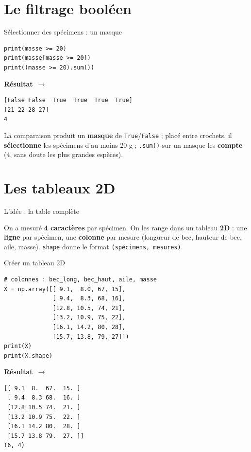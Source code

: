 \documentclass[aspectratio=169,11pt]{beamer}
\newcommand{\resultat}{{\scriptsize\textbf{R\'esultat}~$\rightarrow$}\par\vspace{1pt}}
\begin{document}
\section{Le filtrage booléen}

\begin{frame}[fragile]{Sélectionner des spécimens : un masque}
\begin{lstlisting}
print(masse >= 20)
print(masse[masse >= 20])
print((masse >= 20).sum())
\end{lstlisting}
\resultat
\begin{lstlisting}[style=out]
[False False  True  True  True  True]
[21 22 28 27]
4
\end{lstlisting}
{\small La comparaison produit un \textbf{masque} de \texttt{True}/\texttt{False} ; placé entre crochets, il \textbf{sélectionne} les spécimens d'au moins 20 g ; \texttt{.sum()} sur un masque les \textbf{compte} (4, sans doute les plus grandes espèces).}
\end{frame}

\section{Les tableaux 2D}

\begin{frame}{L'idée : la table complète}
\begin{ucaddef}
{\small On a mesuré \textbf{4 caractères} par spécimen. On les range dans un tableau \textbf{2D} : une \textbf{ligne} par spécimen, une \textbf{colonne} par mesure (longueur de bec, hauteur de bec, aile, masse). \texttt{shape} donne le format \texttt{(spécimens, mesures)}.}
\end{ucaddef}
\end{frame}

\begin{frame}[fragile]{Créer un tableau 2D}
\begin{lstlisting}
# colonnes : bec_long, bec_haut, aile, masse
X = np.array([[ 9.1,  8.0, 67, 15],
              [ 9.4,  8.3, 68, 16],
              [12.8, 10.5, 74, 21],
              [13.2, 10.9, 75, 22],
              [16.1, 14.2, 80, 28],
              [15.7, 13.8, 79, 27]])
print(X)
print(X.shape)
\end{lstlisting}
\resultat
\begin{lstlisting}[style=out]
[[ 9.1  8.  67.  15. ]
 [ 9.4  8.3 68.  16. ]
 [12.8 10.5 74.  21. ]
 [13.2 10.9 75.  22. ]
 [16.1 14.2 80.  28. ]
 [15.7 13.8 79.  27. ]]
(6, 4)
\end{lstlisting}
\end{frame}
\end{document}
